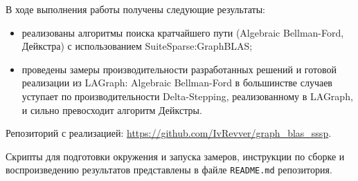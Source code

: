 \documentclass[a4paper]{article}
\begin{document}
В ходе выполнения работы получены следующие результаты:

\begin{itemize}
    \item реализованы алгоритмы поиска кратчайшего пути (Algebraic Bellman-Ford, Дейкстра) с использованием SuiteSparse:GraphBLAS;
    \item проведены замеры производительности разработанных решений и готовой реализации из LAGraph: Algebraic Bellman-Ford в большинстве случаев уступает по производительности Delta-Stepping, реализованному в LAGraph, и сильно превосходит алгоритм Дейкстры.
\end{itemize}

Репозиторий с реализацией: \url{https://github.com/IvRevver/graph_blas_sssp}.

Скрипты для подготовки окружения и запуска замеров, инструкции по сборке и воспроизведению результатов представлены в файле \texttt{README.md} репозитория.
\end{document}
